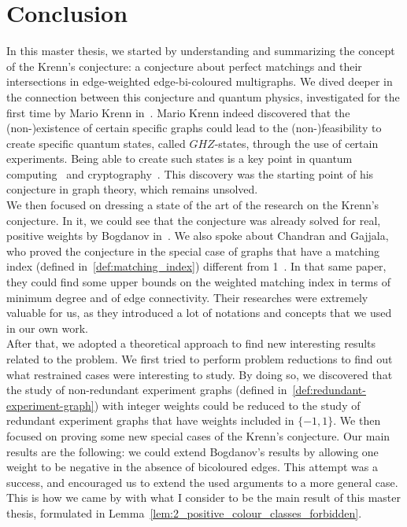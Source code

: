 \setcounter{secnumdepth}{-1}

\chapter{Conclusion}
\label{ch:conclusion}

In this master thesis, we started by understanding and summarizing the concept of the Krenn's conjecture: a conjecture about perfect matchings and their intersections in edge-weighted edge-bi-coloured multigraphs.\cite{wordpress}
We dived deeper in the connection between this conjecture and quantum physics, investigated for the first time by Mario Krenn in~\cite{Krenn_2017}.
Mario Krenn indeed discovered that the (non-)existence of certain specific graphs could lead to the (non-)feasibility to create specific quantum states, called $GHZ$-states, through the use of certain experiments.
Being able to create such states is a key point in quantum computing~\cite{gu2020compact} and cryptography~\cite{pivoluska2018layered}.
This discovery was the starting point of his conjecture in graph theory, which remains unsolved.\\

We then focused on dressing a state of the art of the research on the Krenn's conjecture.
In it, we could see that the conjecture was already solved for real, positive weights by Bogdanov in~\cite{bogdanov}.
We also spoke about Chandran and Gajjala, who proved the conjecture in the special case of graphs that have a matching index (defined in~\ref{def:matching_index}) different from 1~\cite{chandran}.
In that same paper, they could find some upper bounds on the weighted matching index in terms of minimum degree and of edge connectivity.
Their researches were extremely valuable for us, as they introduced a lot of notations and concepts that we used in our own work.\\

After that, we adopted a theoretical approach to find new interesting results related to the problem.
We first tried to perform problem reductions to find out what restrained cases were interesting to study.
By doing so, we discovered that the study of non-redundant experiment graphs (defined in~\ref{def:redundant-experiment-graph}) with integer weights could be reduced to the study of redundant experiment graphs that have weights included in $\{-1, 1\}$.
We then focused on proving some new special cases of the Krenn's conjecture.
Our main results are the following: we could extend Bogdanov's results\cite{bogdanov} by allowing one weight to be negative in the absence of bicoloured edges.
This attempt was a success, and encouraged us to extend the used arguments to a more general case.
This is how we came by with what I consider to be the main result of this master thesis, formulated in Lemma~\ref{lem:2_positive_colour_classes_forbidden}.

